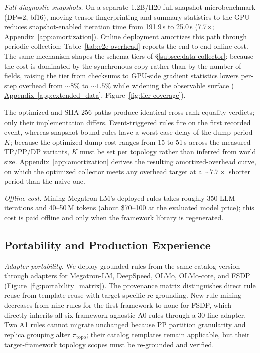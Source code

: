 \documentclass[sigconf,nonacm]{acmart}
\newcommand{\suppappendix}[1]{%
  \href{https://github.com/vivia-an/trainaudit-vldb-artifact/blob/vldb-2027-artifact-v1.0.1/paper/appendix_supplement.pdf}%
  {Appendix~\ref*{#1}}}
\begin{document}
\emph{Full diagnostic snapshots.}
On a separate 1.2B/H20 full-snapshot microbenchmark (DP=2, bf16),
moving tensor fingerprinting and summary statistics to the GPU reduces
snapshot-enabled iteration time from 191.9\,s to 25.0\,s
(7.7$\times$; \suppappendix{app:amortization}). Online deployment amortizes this
path through periodic collection; Table~\ref{tab:e2e-overhead} reports the
end-to-end online cost. The same mechanism shapes the schema tiers of
\S\ref{subsec:data-collector}: because
the cost is dominated by the synchronous copy rather than by the number of
fields, raising the tier from checksums to GPU-side gradient statistics
lowers per-step overhead from ${\sim}8\%$ to ${\sim}1.5\%$ while widening the
observable surface (\suppappendix{app:extended_data}, Figure~\ref{fig:tier-coverage}).

\noindent The optimized and SHA-256 paths produce identical cross-rank equality
verdicts; only their implementation differs. Event-triggered rules fire on the
first recorded event, whereas snapshot-bound rules have a worst-case delay of
the dump period $K$; because the optimized dump cost ranges from 15 to 51\,s
across the measured TP/PP/DP variants, $K$ must be set per topology rather
than inferred from world size. \suppappendix{app:amortization} derives the
resulting amortized-overhead curve, on which the optimized collector meets any
overhead target at a ${\sim}7.7\times$ shorter period than the naive one.

\emph{Offline cost.}
Mining Megatron-LM's deployed rules takes roughly 350 LLM iterations and
40--50\,M tokens (about \$70--100 at the evaluated model price); this cost is
paid offline and only when the framework library is regenerated.

\subsection{Portability and Production Experience}
\label{subsec:scalability}

\noindent\emph{Adapter portability.}
We deploy grounded rules from the same catalog version through adapters for
Megatron-LM, DeepSpeed, OLMo, OLMo-core, and FSDP
(Figure~\ref{fig:portability_matrix}). The provenance matrix distinguishes
direct rule reuse from template reuse with target-specific re-grounding. New
rule mining decreases from nine rules for the first framework to none for
FSDP, which directly inherits all six framework-agnostic A0 rules through a
30-line adapter. Two A1 rules cannot migrate unchanged because PP partition
granularity and replica grouping alter $\pi_{\text{topo}}$; their catalog
templates remain applicable, but their target-framework topology scopes must
be re-grounded and verified.
\end{document}
